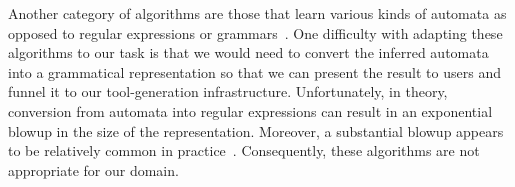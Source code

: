 

Another category of algorithms are those that learn various kinds of
automata as opposed to regular expressions or 
grammars~\cite{denis:learning-regular-languages,rpni,raeymaekers+:learning-tree-languages}.  
One difficulty with adapting these algorithms to our task is that 
we would need to convert the inferred automata into a 
grammatical representation so that we can
present the result to users and funnel it
to our tool-generation infrastructure.
Unfortunately, in theory, conversion from automata into
regular expressions can result in an exponential blowup in the
size of the representation.
Moreover, a substantial blowup appears to be relatively common in
practice~\cite{bex+:dtd-inference}.  Consequently, these algorithms
are not appropriate for our domain.




  

